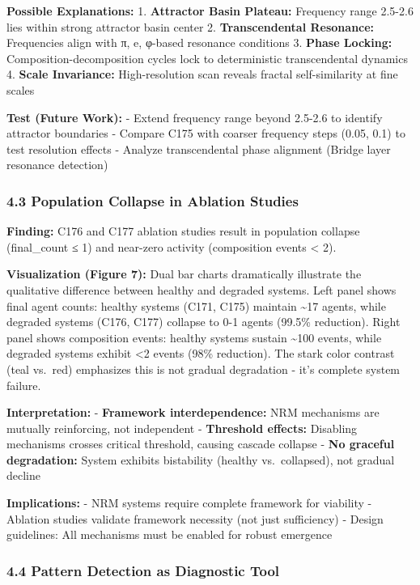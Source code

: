 \documentclass[
]{article}
\begin{document}
\textbf{Possible Explanations:} 1. \textbf{Attractor Basin Plateau:}
Frequency range 2.5-2.6 lies within strong attractor basin center 2.
\textbf{Transcendental Resonance:} Frequencies align with π, e, φ-based
resonance conditions 3. \textbf{Phase Locking:}
Composition-decomposition cycles lock to deterministic transcendental
dynamics 4. \textbf{Scale Invariance:} High-resolution scan reveals
fractal self-similarity at fine scales

\textbf{Test (Future Work):} - Extend frequency range beyond 2.5-2.6 to
identify attractor boundaries - Compare C175 with coarser frequency
steps (0.05, 0.1) to test resolution effects - Analyze transcendental
phase alignment (Bridge layer resonance detection)

\subsubsection{4.3 Population Collapse in Ablation
Studies}\label{population-collapse-in-ablation-studies}

\textbf{Finding:} C176 and C177 ablation studies result in population
collapse (final\_count ≤ 1) and near-zero activity (composition events
\textless{} 2).

\textbf{Visualization (Figure 7):} Dual bar charts dramatically
illustrate the qualitative difference between healthy and degraded
systems. Left panel shows final agent counts: healthy systems (C171,
C175) maintain \textasciitilde17 agents, while degraded systems (C176,
C177) collapse to 0-1 agents (99.5\% reduction). Right panel shows
composition events: healthy systems sustain \textasciitilde100 events,
while degraded systems exhibit \textless2 events (98\% reduction). The
stark color contrast (teal vs.~red) emphasizes this is not gradual
degradation - it's complete system failure.

\textbf{Interpretation:} - \textbf{Framework interdependence:} NRM
mechanisms are mutually reinforcing, not independent - \textbf{Threshold
effects:} Disabling mechanisms crosses critical threshold, causing
cascade collapse - \textbf{No graceful degradation:} System exhibits
bistability (healthy vs.~collapsed), not gradual decline

\textbf{Implications:} - NRM systems require complete framework for
viability - Ablation studies validate framework necessity (not just
sufficiency) - Design guidelines: All mechanisms must be enabled for
robust emergence

\subsubsection{4.4 Pattern Detection as Diagnostic
Tool}\label{pattern-detection-as-diagnostic-tool}
\end{document}
